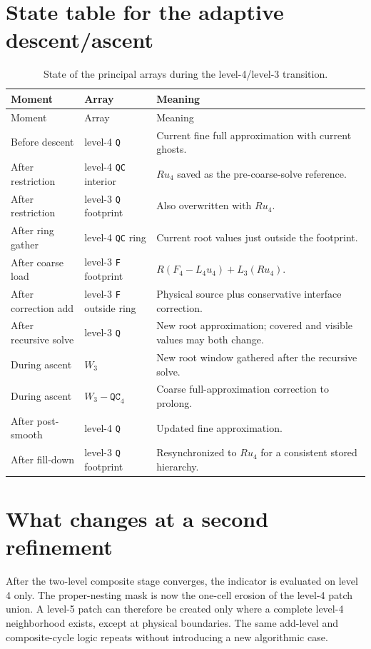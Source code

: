\documentclass[11pt,oneside,openany]{book}
\newcommand{\code}[1]{\textnormal{\texttt{#1}}}
\begin{document}
\section{State table for the adaptive descent/ascent}
\begin{longtable}{@{}>{\raggedright\arraybackslash}p{}>{\raggedright\arraybackslash}p{}p{}@{}}
\caption{State of the principal arrays during the level-4/level-3 transition.}\label{tab:dryrunstate}\\
\toprule
Moment & Array & Meaning \\
\midrule
\endfirsthead
\toprule
Moment & Array & Meaning \\
\midrule
\endhead
Before descent & level-4 \code{Q} & Current fine full approximation with current ghosts. \\
After restriction & level-4 \code{QC} interior & $Ru_4$ saved as the pre-coarse-solve reference. \\
After restriction & level-3 \code{Q} footprint & Also overwritten with $Ru_4$. \\
After ring gather & level-4 \code{QC} ring & Current root values just outside the footprint. \\
After coarse load & level-3 \code{F} footprint & $R(F_4-L_4u_4)+L_3(Ru_4)$. \\
After correction add & level-3 \code{F} outside ring & Physical source plus conservative interface correction. \\
After recursive solve & level-3 \code{Q} & New root approximation; covered and visible values may both change. \\
During ascent & $W_3$ & New root window gathered after the recursive solve. \\
During ascent & $W_3-\ensuremath{\mathtt{QC}_{4}}$ & Coarse full-approximation correction to prolong. \\
After post-smooth & level-4 \code{Q} & Updated fine approximation. \\
After fill-down & level-3 \code{Q} footprint & Resynchronized to $Ru_4$ for a consistent stored hierarchy. \\
\bottomrule
\end{longtable}

\section{What changes at a second refinement}
After the two-level composite stage converges, the indicator is evaluated on level 4 only. The proper-nesting mask is now the one-cell erosion of the level-4 patch union. A level-5 patch can therefore be created only where a complete level-4 neighborhood exists, except at physical boundaries. The same add-level and composite-cycle logic repeats without introducing a new algorithmic case.
\end{document}
